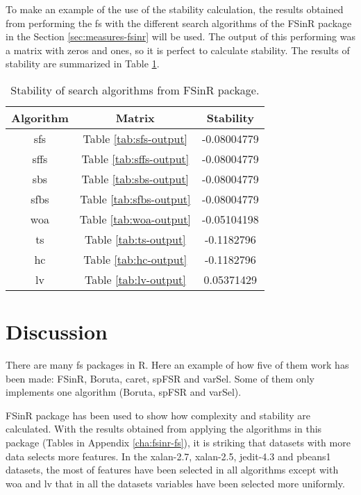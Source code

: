 To make an example of the use of the stability calculation, the results obtained from performing the \acrshort{fs} with the different search algorithms of the FSinR package in the Section \ref{sec:measures-fsinr} will be used. The output of this performing was a matrix with zeros and ones, so it is perfect to calculate stability. The results of stability are summarized in Table \ref{tab:stability-output}.
    
\begin{table}[H]
\centering
    \begin{tabular}{|c|c|c|}
        \hline
        Algorithm & Matrix & Stability \\ \hline
        \acrshort{sfs} & Table \ref{tab:sfs-output} & -0.08004779 \\ \hline
        \acrshort{sffs} & Table \ref{tab:sffs-output} & -0.08004779 \\ \hline
        \acrshort{sbs} & Table \ref{tab:sbs-output} & -0.08004779 \\ \hline
        \acrshort{sfbs} & Table \ref{tab:sfbs-output} & -0.08004779 \\ \hline
        \acrshort{woa} & Table \ref{tab:woa-output} & -0.05104198 \\ \hline
        \acrshort{ts} & Table \ref{tab:ts-output} & -0.1182796 \\ \hline
        \acrshort{hc} & Table \ref{tab:hc-output} & -0.1182796 \\ \hline
        \acrshort{lv} & Table \ref{tab:lv-output} & 0.05371429 \\ \hline
    \end{tabular}
\caption{Stability of search algorithms from FSinR package.}
\label{tab:stability-output}
\end{table}

\section{Discussion}
\label{sec:discussion}

There are many \acrlong{fs} packages in R. Here an example of how five of them work has been made: FSinR, Boruta, \acrshort{caret}, spFSR and varSel. Some of them only implements one algorithm (Boruta, spFSR and varSel).

FSinR package has been used to show how complexity and stability are calculated. With the results obtained from applying the algorithms in this package (Tables in Appendix \ref{cha:fsinr-fs}), it is striking that datasets with more data selects more features. In the xalan-2.7, xalan-2.5, jedit-4.3 and pbeans1 datasets, the most of features have been selected in all algorithms except with \acrlong{woa} and \acrlong{lv} that in all the datasets variables have been selected more uniformly.

